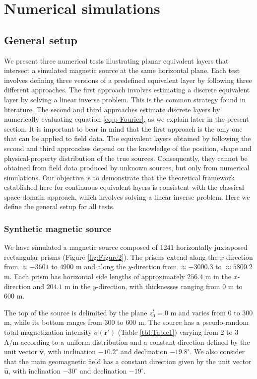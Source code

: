 \documentclass[manuscript,noblind]{geophysics}
\begin{document}
	\section{Numerical simulations}
	\label{eq:numerical_simulations}
	
	\subsection{General setup}
	
	We present three numerical tests illustrating planar equivalent layers that intersect a simulated 
	magnetic source at the same horizontal plane.
	Each test involves defining three versions of a predefined equivalent layer by following three different approaches.
	The first approach involves estimating a discrete equivalent layer by solving a linear inverse problem. 
	This is the common strategy found in literature.
	The second and third approaches estimate discrete layers by numerically evaluating equation \ref{eq:p-Fourier}, 
	as we explain later in the present section. 
	It is important to bear in mind that the first approach is the only one that can be applied to field data.
	The equivalent layers obtained by following the second and third approaches depend on the knowledge of
	the position, shape and physical-property distribution of the true sources. Consequently, they cannot be 
	obtained from field data produced by unknown sources, but only from numerical simulations.
	Our objective is to demonstrate that the theoretical framework established here for continuous equivalent 
	layers is consistent with the classical space-domain approach, which involves solving a linear inverse problem.
	Here we define the general setup for all tests.
	
	\subsubsection{Synthetic magnetic source}
	
	We have simulated a magnetic source composed of $1241$ horizontally juxtaposed rectangular prisms
	(Figure \ref{fig:Figure2}). 
	The prisms extend along the $x$-direction from $\approx -3601$ to $4900$ m and 
	along the $y$-direction from $\approx -3000.3$ to $\approx 5800.2$ m. 
	Each prism has horizontal side lengths of approximately $256.4$ m in the $x$-direction 
	and $204.1$ m in the $y$-direction, with thicknesses ranging from $0$ m to $600$ m. 
	
	The top of the source is delimited by the plane $z^{t}_{0} = 0$ m and varies 
	from $0$ to $300$ m, while its bottom ranges from $300$ to $600$ m.
	The source has a pseudo-random total-magnetization intensity $\sigma(\mathbf{r}')$ (Table \ref{tbl:Table1}) 
	varying from $2$ to $3$ A/m according to a uniform distribution and a constant direction defined by the 
	unit vector $\hat{\mathbf{v}}$, with inclination $-10.2^{\circ}$ and declination $-19.8^{\circ}$. 
	We also consider that the main geomagnetic field has a constant direction given by the unit vector $\hat{\mathbf{u}}$,
	with inclination $-30^{\circ}$ and declination $-19^{\circ}$. 
	
\end{document}
